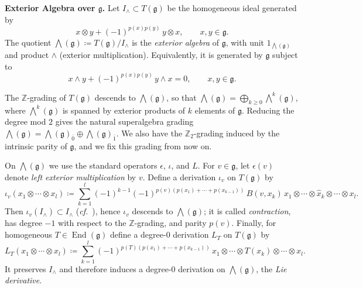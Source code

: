 \documentclass[11pt]{amsart}
\newcommand{\End}{\operatorname{End}}
\def\gg{{\mathfrak{g}}}
\def\ZZ{{\mathbb Z}}
\theoremstyle{plain}
\theoremstyle{remark}
\theoremstyle{definition}
\numberwithin{equation}{section}
\theoremstyle{remark}
\begin{document}
\noindent
\textbf{Exterior Algebra over $\gg$.}
Let $I_{\wedge}\subset T(\gg)$ be the homogeneous ideal generated by
\begin{equation}
x\otimes y+(-1)^{p(x)p(y)}\,y\otimes x,\qquad x,y\in\gg.
\end{equation}
The quotient $\bigwedge(\gg)\coloneqq T(\gg)/I_{\wedge}$ is the \emph{exterior algebra} of $\gg$, with unit $1_{\bigwedge(\gg)}$ and product $\wedge$ (exterior multiplication). Equivalently, it is generated by $\gg$ subject to
\begin{equation}
x\wedge y+(-1)^{p(x)p(y)}\,y\wedge x=0,\qquad x,y\in\gg.
\end{equation}

The $\ZZ$-grading of $T(\gg)$ descends to $\bigwedge(\gg)$, so that $\bigwedge(\gg)=\bigoplus_{k\ge 0}\bigwedge^{\!k}(\gg)$, where
$\bigwedge^{\!k}(\gg)$ is spanned by exterior products of $k$ elements of $\gg$. Reducing the degree mod $2$ gives the natural superalgebra grading
$\bigwedge(\gg)=\bigwedge(\gg)_{\bar{0}}\oplus \bigwedge(\gg)_{\bar{1}}$. We also have the $\ZZ_{2}$-grading induced by the intrinsic parity of $\gg$, and we fix this grading from now on.

On $\bigwedge(\gg)$ we use the standard operators $\epsilon$, $\iota$, and $L$.
For $v\in\gg$, let $\epsilon(v)$ denote \emph{left exterior multiplication} by $v$.
Define a derivation $\iota_v$ on $T(\gg)$ by
\begin{equation}\label{eq::contraction}
\iota_{v}(x_{1}\otimes\cdots\otimes x_{l})
\coloneqq \sum_{k=1}^{l}(-1)^{k-1}(-1)^{p(v)(p(x_{1})+\cdots+p(x_{k-1}))}\,B(v,x_{k})\,
x_{1}\otimes\cdots\otimes \widehat{x}_{k}\otimes\cdots\otimes x_{l}.
\end{equation}
Then $\iota_v(I_{\wedge})\subset I_{\wedge}$ (\emph{cf.}~\cite[Proposition~4.5]{generalized_Clifford}), hence $\iota_v$ descends to
$\bigwedge(\gg)$; it is called \emph{contraction}, has degree $-1$ with respect to the $\ZZ$-grading, and parity $p(v)$.
Finally, for homogeneous $T\in\End(\gg)$ define a degree-$0$ derivation $L_T$ on $T(\gg)$ by
\begin{equation}\label{eq::Lie_derivative}
L_{T}(x_{1}\otimes\cdots\otimes x_{l})
\coloneqq \sum_{k=1}^{l}(-1)^{p(T)(p(x_{1})+\cdots+p(x_{k-1}))}\,
x_{1}\otimes\cdots\otimes T(x_{k})\otimes\cdots\otimes x_{l}.
\end{equation}
It preserves $I_{\wedge}$ and therefore induces a degree-$0$ derivation on $\bigwedge(\gg)$, the \emph{Lie derivative}.
\end{document}
